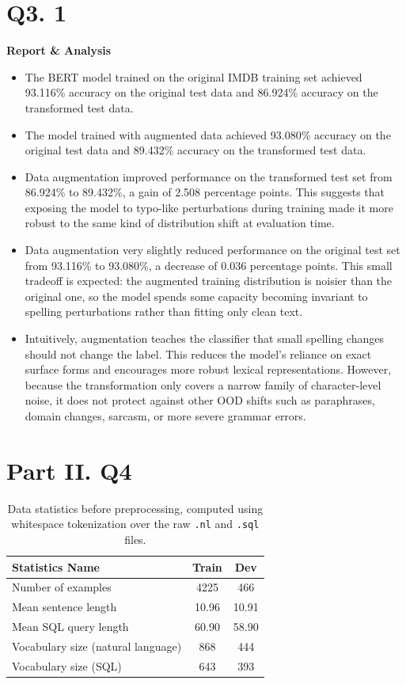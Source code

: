 \documentclass{article}
\begin{document}
\section*{Q3. 1}
\textbf{Report \& Analysis}
    \begin{itemize}
        \item The BERT model trained on the original IMDB training set achieved 93.116\% accuracy on the original test data and 86.924\% accuracy on the transformed test data.
        \item The model trained with augmented data achieved 93.080\% accuracy on the original test data and 89.432\% accuracy on the transformed test data.
        \item Data augmentation improved performance on the transformed test set from 86.924\% to 89.432\%, a gain of 2.508 percentage points. This suggests that exposing the model to typo-like perturbations during training made it more robust to the same kind of distribution shift at evaluation time.
        \item Data augmentation very slightly reduced performance on the original test set from 93.116\% to 93.080\%, a decrease of 0.036 percentage points. This small tradeoff is expected: the augmented training distribution is noisier than the original one, so the model spends some capacity becoming invariant to spelling perturbations rather than fitting only clean text.
        \item Intuitively, augmentation teaches the classifier that small spelling changes should not change the label. This reduces the model's reliance on exact surface forms and encourages more robust lexical representations. However, because the transformation only covers a narrow family of character-level noise, it does not protect against other OOD shifts such as paraphrases, domain changes, sarcasm, or more severe grammar errors.
    \end{itemize}

\section*{Part II. Q4}

\begin{table}[h!]
\centering
\begin{tabular}{lcc}
\toprule
Statistics Name & Train & Dev \\
\midrule
Number of examples & 4225 & 466 \\
Mean sentence length & 10.96 & 10.91 \\
Mean SQL query length & 60.90 & 58.90 \\
Vocabulary size (natural language) & 868 & 444 \\
Vocabulary size (SQL) & 643 & 393 \\
\bottomrule
\end{tabular}
\caption{Data statistics before preprocessing, computed using whitespace tokenization over the raw \texttt{.nl} and \texttt{.sql} files.}
\label{tab:data_stats_before}
\end{table}
\end{document}
